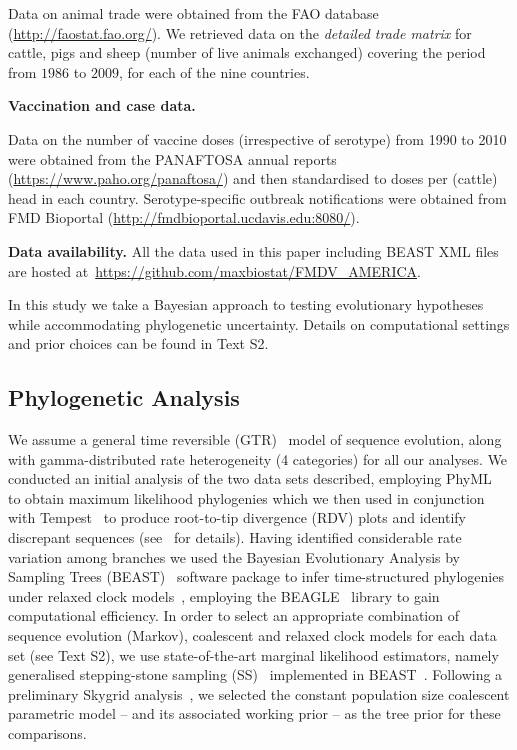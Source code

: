 \documentclass[10pt]{article}
\begin{document}
Data on animal trade were obtained from the FAO database (\url{http://faostat.fao.org/}).
We retrieved data on the \textit{detailed trade matrix} %
for cattle, pigs and sheep (number of live animals exchanged) covering the period from $1986$ to $2009$, for each of the nine countries.

\textbf{Vaccination and case data.}

Data on the number of vaccine doses (irrespective of serotype) from 1990 to 2010 were obtained from the PANAFTOSA annual reports (\url{https://www.paho.org/panaftosa/}) and then standardised to doses per (cattle) head in each country.
Serotype-specific outbreak notifications were obtained from FMD Bioportal (\url{http://fmdbioportal.ucdavis.edu:8080/}).

\textbf{Data availability.} All the data used in this paper including BEAST XML files are hosted at~\url{https://github.com/maxbiostat/FMDV_AMERICA}.

In this study we take a Bayesian approach to testing evolutionary hypotheses while accommodating phylogenetic uncertainty.
Details on computational settings and prior choices can be found in Text S2.

\subsection*{Phylogenetic Analysis}

We assume a general time reversible (GTR)~\citep{Tavare1986} model of sequence evolution, along with gamma-distributed rate heterogeneity (4 categories) for all our analyses.
We conducted an initial analysis of the two data sets described, employing PhyML~\citep{Guindon2003} to obtain maximum likelihood phylogenies which we then used in conjunction with Tempest~\citep{Rambaut2016} to produce root-to-tip divergence (RDV) plots and identify discrepant sequences (see~\cite{Rambaut2016} for details).
Having identified considerable rate variation among branches we used the Bayesian Evolutionary Analysis by Sampling Trees (BEAST)~\citep{Suchard2018} software package to infer time-structured phylogenies under relaxed clock models~\citep{Drummond2006}, employing the BEAGLE~\citep{Ayres2012,Ayres2019} library to gain computational efficiency. %
In order to select an appropriate combination of sequence evolution (Markov), coalescent and relaxed clock models for each data set (see Text S2), we use state-of-the-art marginal likelihood estimators, namely generalised stepping-stone sampling (SS)~\citep{Baele2016} %
implemented in BEAST~\citep{Suchard2018}.
Following a preliminary Skygrid analysis~\citep{Gill2013}, we selected the constant population size coalescent parametric model -- and its associated working prior -- as the tree prior for these comparisons.
\end{document}

